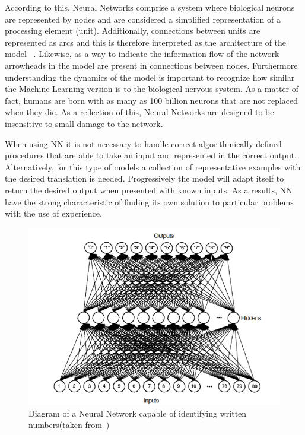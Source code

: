 According to this, Neural Networks comprise a system where biological neurons are represented by nodes and are considered a simplified representation of a processing element (unit). Additionally, connections between units are represented as arcs and this is therefore interpreted as the architecture of the model ~\cite{fausett93}. Likewise, as a way to indicate the information flow of the network arrowheads in the model are present in connections between nodes. Furthermore understanding the dynamics of the model is important to recognize how similar the Machine Learning version is to the biological nervous system. As a matter of fact, humans are born with as many as 100 billion neurons that are not replaced when they die. As a reflection of this, Neural Networks are designed to be insensitive to small damage to the network. 

When using  \ac{NN}  it is not necessary to handle correct algorithmically defined procedures that are able to take an input and represented in the correct output. Alternatively, for this type of models a collection of representative examples with the desired translation is needed. Progressively the model will adapt itself to return the desired output when presented with known inputs. As a results, \ac{NN}  have the strong characteristic of finding its  own solution to particular problems with the use of experience. 

\begin{figure}[htbp]
  \centering
  \includegraphics[width=\textwidth]{images/net}
  \caption{ Diagram of a Neural Network capable of identifying written numbers(taken from~\cite{freeman91}) }
  \label{fig:neuronNet}
\end{figure}

